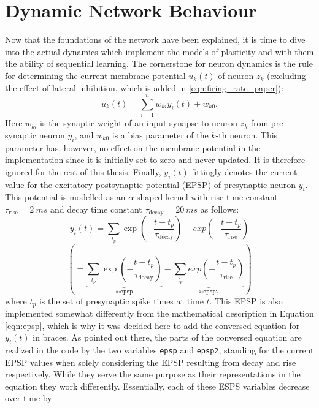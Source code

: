 \section{Dynamic Network Behaviour} \label{sec:dynamic_network_behaviour}
Now that the foundations of the network have been explained, it is time to dive into the actual dynamics which implement the models of plasticity and with them the ability of sequential learning. The cornerstone for neuron dynamics is the rule for determining the current membrane potential $u_k(t)$ of neuron $z_k$ (excluding the effect of lateral inhibition, which is added in \ref{eqn:firing_rate_paper}):
\begin{equation}
    u_k(t)=\sum_{i=1}^{n} w_{ki}y_i(t) + w_{k0}.
    \label{eqn:membrane_potential}
\end{equation}
Here $w_{ki}$ is the synaptic weight of an input synapse to neuron $z_k$ from pre-synaptic neuron $y_i$, and $w_{k0}$ is a bias parameter of the $k$-th neuron. This parameter has, however, no effect on the membrane potential in the implementation since it is initially set to zero and never updated. It is therefore ignored for the rest of this thesis. Finally, $y_i(t)$ fittingly denotes the current value for the excitatory postsynaptic potential (EPSP) of presynaptic neuron $y_i$. This potential is modelled as an $\alpha$-shaped kernel with rise time constant $\tau_{\text{rise}}=\SI{2}{ms}$ and decay time constant $\tau_{\text{decay}}=\SI{20}{ms}$ as follows:
\begin{equation}
    y_i(t)= \underset{t_p}{\sum} \exp\left(-\frac{t-t_p}{\tau_{\text{decay}}}\right) - exp\left(-\frac{t-t_p}{\tau_{\text{rise}}}\right)
    \label{eqn:epsp}
\end{equation}
\begin{equation*}
    \left(= \underbrace{\underset{t_p}{\sum} \exp\left(-\frac{t-t_p}{\tau_{\text{decay}}}\right)}_{\approx\texttt{epsp}} - \underbrace{\underset{t_p}{\sum} exp\left(-\frac{t-t_p}{\tau_{\text{rise}}}\right)}_{\approx\texttt{epsp2}}\right)
\end{equation*}
where $t_p$ is the set of presynaptic spike times at time $t$. This EPSP is also implemented somewhat differently from the mathematical description in Equation \ref{eqn:epsp}, which is why it was decided here to add the conversed equation for $y_i(t)$ in braces. As pointed out there, the parts of the conversed equation are realized in the code by the two variables \texttt{epsp} and \texttt{epsp2}, standing for the current EPSP values when solely considering the EPSP resulting from decay and rise respectively. While they serve the same purpose as their representations in the equation they work differently. Essentially, each of these ESPS variables decrease over time by 
